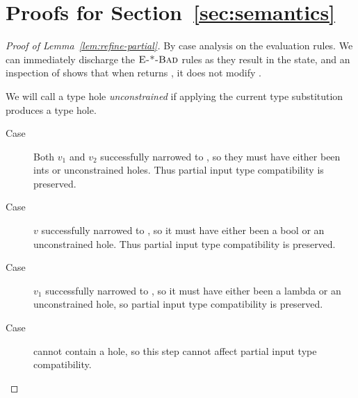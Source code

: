 \section{Proofs for Section~\ref{sec:semantics}}
\label{sec:proofs}

\begin{proof}[Proof of Lemma~\ref{lem:refine-partial}]
  By case analysis on the evaluation rules. We can immediately discharge
  the $\textsc{E-*-Bad}$ rules as they result in the \stuck state, and
  an inspection of \forcesym shows that when \forcesym returns \stuck,
  it does not modify \vsu.


  We will call a type hole \thole \emph{unconstrained} if applying the
  current type substitution \subst{\tsu}{\thole} produces a type hole.

  \begin{description}
  \item[Case \replusgood] Both $v_1$ and $v_2$ successfully narrowed to
    \tint, so they must have either been ints or unconstrained
    holes. Thus partial input type compatibility is preserved.

  \item[Case ] $v$ successfully narrowed to
    \tbool, so it must have either been a bool or an unconstrained hole.
    Thus partial input type compatibility is preserved.

  \item[Case \reappgood] $v_1$ successfully narrowed to \tfun, so it
    must have either been a lambda or an unconstrained hole, so partial
    input type compatibility is preserved.

  \item[Case \releafgood] \eleaf cannot contain a hole, so this step cannot
    affect partial input type compatibility.


\end{description}
\end{proof}
